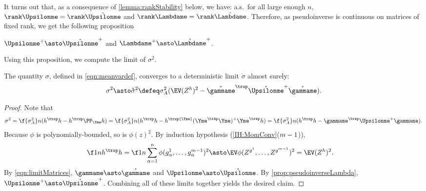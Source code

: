\documentclass[main.tex]{subfiles}
\begin{document}
It turns out that, as a consequence of \cref{lemma:rankStability} below, we have: a.s.\ for all large enough $n$, $\rank \Upsilonme  = \rank \mathring {\Upsilonme }$ and $\rank \Lambdame  = \rank \mathring{\Lambdame }$.
Therefore, as pseudoinverse is continuous on matrices of fixed rank,
we get the following proposition
\begin{prop}\label{prop:pseudoinverseLambda}
$\Upsilonme ^+ \asto \mathring{\Upsilonme }^+$ and $\Lambdame ^+ \asto \mathring{\Lambdame }^+$.
\end{prop}

Using this proposition, we compute the limit of $\sigma^2$.
\begin{lemma}\label{lemma:sigmaConverges}
The quantity $\sigma$, defined in \cref{eqn:meanvardef}, converges to a deterministic limit $\mathring \sigma$ almost surely:
\begin{equation}\sigma^2 \asto \mathring \sigma^2 \defeq \sigma_A^2 (\EV (Z^h)^2 - \mathring \gammame^\trsp \mathring \Upsilonme^+ \mathring \gammame).
  \label{eqn:mathringsigma}
\end{equation}
\end{lemma}
\begin{proof}
Note that
\begin{align*}
    \sigma^2 = \f {\sigma_A^2} n (h^\trsp h - h^\trsp \PP_{\Yme} h)
        = \f {\sigma_A^2} n (h^\trsp h - h^\trsp {\Yme} (\Yme^\trsp \Yme)^+ \Yme^\trsp h)
        = \f {\sigma_A^2} n (h^\trsp h - \gammame^\trsp \Upsilonme ^+ \gammame).
\end{align*}
Because $\phi$ is polynomially-bounded, so is $\phi(z)^2$.
By induction hypothesis (\ref{IH:MomConv}($m-1$)),
\begin{align*}
    \f 1 n h^\trsp h = \f 1 n \sum_{\alpha = 1}^n \phi(g^1_\alpha, \ldots, g^{\MM - 1}_\alpha)^2
    \asto
    &\EV
      \phi(Z^{g^1}, \ldots, Z^{g^{\MM-1}})^2
    =
      \EV (Z^h)^2
      .
\end{align*}
By \cref{eqn:limitMatrices}, $\gammame \asto \mathring{\gammame}$ and $\Upsilonme  \asto \mathring{\Upsilonme }$.
By \cref{prop:pseudoinverseLambda}, $\Upsilonme ^+ \asto \mathring{\Upsilonme }^+$.
Combining all of these limits together yields the desired claim.
\end{proof}
\end{document}
